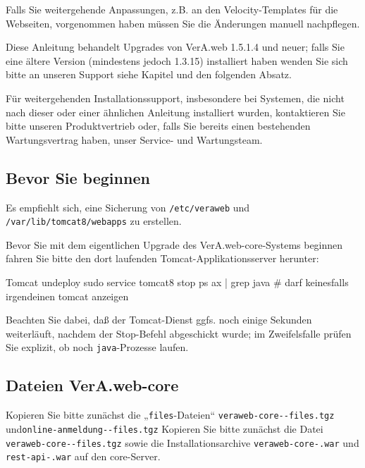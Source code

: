 Falls Sie weitergehende Anpassungen, z.B. an den Velocity-Templates
für die Webseiten, vorgenommen haben müssen Sie die Änderungen
manuell nachpflegen.

Diese Anleitung behandelt Upgrades von VerA.web 1.5.1.4 und neuer;
falls Sie eine ältere Version (mindestens jedoch 1.3.15) installiert
haben wenden Sie sich bitte an unseren Support \dash siehe Kapitel
 und den folgenden Absatz.

Für weitergehenden Installationssupport, insbesondere bei Systemen,
die nicht nach dieser oder einer ähnlichen Anleitung installiert
wurden, kontaktieren Sie bitte unseren Produktvertrieb oder, falls
Sie bereits einen bestehenden Wartungsvertrag haben, unser Service-
und Wartungsteam.

\subsection{Bevor Sie beginnen}\label{subsec:upgrade-core-pre}

Es empfiehlt sich, eine Sicherung von \texttt{/etc/veraweb} und
\texttt{/var/lib/tomcat8/webapps} zu erstellen.

\begin{minipage}{\linewidth}
Bevor Sie mit dem eigentlichen Upgrade des VerA.web-core-Systems beginnen
fahren Sie bitte den dort laufenden Tomcat-Applikationsserver herunter:

\begin{lstdump}{Tomcat undeploy}
sudo service tomcat8 stop
ps ax | grep java # darf keinesfalls irgendeinen tomcat anzeigen
\end{lstdump}

Beachten Sie dabei, daß der Tomcat-Dienst ggfs. noch einige Sekunden
weiterläuft, nachdem der Stop-Befehl abgeschickt wurde; im Zweifelsfalle
prüfen Sie explizit, ob noch \texttt{java}-Prozesse laufen.
\end{minipage}

\subsection{Dateien VerA.web-core}\label{subsec:upgrade-core-files}

\ifoa
Kopieren Sie bitte zunächst die „\texttt{files}-Dateien“
\texttt{veraweb-core-\vwiaverssw{}-files.tgz} und\linebreak[1]
\texttt{online-anmeldung-\vwiaverssw{}-files.tgz}
\else%
Kopieren Sie bitte zunächst die Datei
\texttt{veraweb-core-\vwiaverssw{}-files.tgz}
\fi%
sowie die
Installationsarchive \texttt{veraweb-core-\vwiaverssw{}.war}
und \texttt{rest-api-\vwiaverssw{}.war} auf den core-Server.

